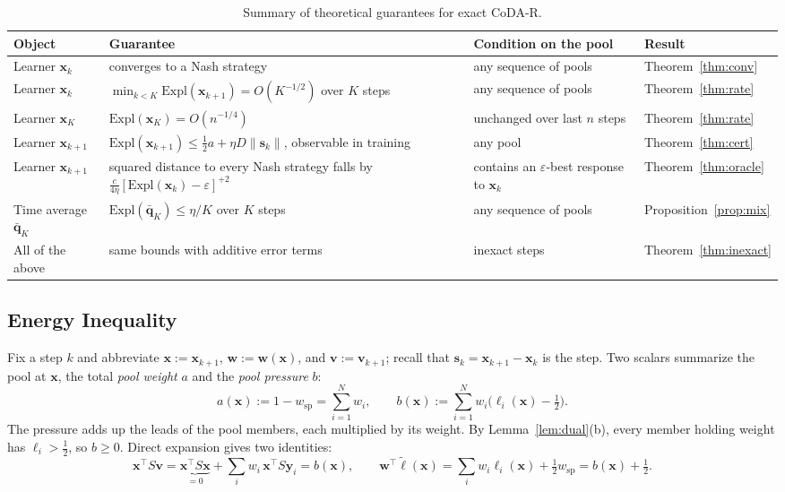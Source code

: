 \documentclass{article}
\theoremstyle{plain}
\theoremstyle{remark}
\newcommand{\Expl}{\mathrm{Expl}}
\newcommand{\bx}{{\bm{x}}}
\newcommand{\by}{{\bm{y}}}
\newcommand{\bv}{{\bm{v}}}
\newcommand{\bw}{{\bm{w}}}
\newcommand{\bq}{{\bm{q}}}
\newcommand{\bell}{{\bm{\ell}}}
\newcommand{\aug}{\tilde{\bell}}
\newcommand{\dx}{{\bm{s}}}
\newcommand{\wsp}{w_{\mathrm{sp}}}
\newcommand{\codar}{CoDA-R}
\begin{document}
\begin{table}[t]
\caption{Summary of theoretical guarantees for exact \codar{}.}
\label{tab:guarantees}
\begin{center}
\footnotesize
\setlength{\tabcolsep}{4pt}
\begin{tabular}{p{2.3cm}p{5.6cm}p{3.6cm}l}
\toprule
Object & Guarantee & Condition on the pool & Result \\
\midrule
Learner $\bx_k$ & converges to a Nash strategy & any sequence of pools & Theorem~\ref{thm:conv} \\
Learner $\bx_k$ & $\min_{k<K}\Expl(\bx_{k+1})=O(K^{-1/2})$ over $K$ steps & any sequence of pools & Theorem~\ref{thm:rate} \\
Learner $\bx_K$ & $\Expl(\bx_K)=O(n^{-1/4})$ & unchanged over last $n$ steps & Theorem~\ref{thm:rate} \\
Learner $\bx_{k+1}$ & $\Expl(\bx_{k+1})\le\tfrac12a+\eta D\|\dx_k\|$, observable in training & any pool & Theorem~\ref{thm:cert} \\
Learner $\bx_{k+1}$ & squared distance to every Nash strategy falls by $\tfrac{c}{4\eta}[\Expl(\bx_k)-\varepsilon]^{+2}$ & contains an $\varepsilon$-best response to $\bx_k$ & Theorem~\ref{thm:oracle} \\
Time average $\bar{\bq}_K$ & $\Expl(\bar{\bq}_K)\le\eta/K$ over $K$ steps & any sequence of pools & Proposition~\ref{prop:mix} \\
All of the above & same bounds with additive error terms & inexact steps & Theorem~\ref{thm:inexact} \\
\bottomrule
\end{tabular}
\end{center}
\end{table}

\subsection{Energy Inequality}
\label{sec:energy}

Fix a step $k$ and abbreviate $\bx:=\bx_{k+1}$, $\bw:=\bw(\bx)$, and $\bv:=\bv_{k+1}$; recall that $\dx_k=\bx_{k+1}-\bx_k$ is the step. Two scalars summarize the pool at $\bx$, the total \emph{pool weight} $a$ and the \emph{pool pressure} $b$:
\[
a(\bx):=1-\wsp=\sum_{i=1}^Nw_i,\qquad
b(\bx):=\sum_{i=1}^Nw_i\big(\ell_i(\bx)-\tfrac12\big).
\]
The pressure adds up the leads of the pool members, each multiplied by its weight. By Lemma~\ref{lem:dual}(b), every member holding weight has $\ell_i>\tfrac12$, so $b\ge0$. Direct expansion gives two identities:
\begin{equation}
\bx^\top S\bv=\underbrace{\bx^\top S\bx}_{=0}+\textstyle\sum_iw_i\,\bx^\top S\by_i=b(\bx),\qquad
\bw^\top\aug(\bx)=\textstyle\sum_iw_i\ell_i(\bx)+\tfrac12\wsp=b(\bx)+\tfrac12 .
\label{eq:identities}
\end{equation}
\end{document}
